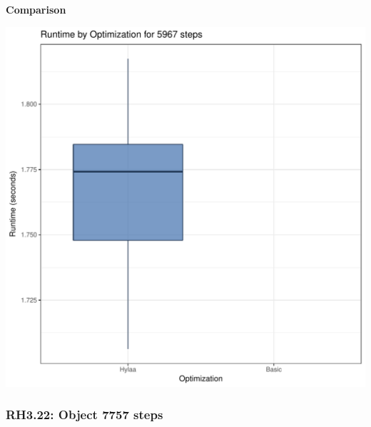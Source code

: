 \documentclass{article}\usepackage[]{graphicx}\usepackage[]{color}
\makeatletter
\def\maxwidth{ %
  \ifdim\Gin@nat@width>\linewidth
    \linewidth
  \else
    \Gin@nat@width
  \fi
}
\newenvironment{knitrout}{}{} %
\makeatother
\begin{document}
 \textbf{Comparison}
  
\begin{knitrout}
\color{fgcolor}
\includegraphics[width=\maxwidth]{figure/RH3_steps5967-1} 

\end{knitrout}


\subsubsection{RH3.22: Object 7757 steps}
\end{document}
